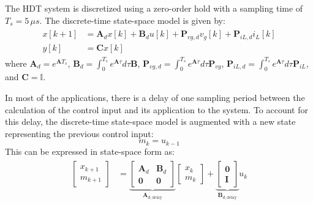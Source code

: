 The HDT system is discretized using a zero-order hold with a sampling time of $T_s = 5\,\mu s$. The discrete-time state-space model is given by:
\begin{align}
    \begin{aligned}
        x[k+1] &= \mathbf{A}_d x[k] + \mathbf{B}_d u[k] + \mathbf{P}_{vg,d} v_g[k] + \mathbf{P}_{iL,d} i_L[k]\\
        y[k] &= \mathbf{C} x[k]
    \end{aligned}
\end{align}
where $\mathbf{A}_d = e^{\mathbf{A}T_s}$, $\mathbf{B}_d = \int_0^{T_s} e^{\mathbf{A}\tau} d\tau \mathbf{B}$, $\mathbf{P}_{vg,d} = \int_0^{T_s} e^{\mathbf{A}\tau} d\tau \mathbf{P}_{vg}$, $\mathbf{P}_{iL,d} = \int_0^{T_s} e^{\mathbf{A}\tau} d\tau \mathbf{P}_{iL}$, and $\mathbf{C} = \mathbb{I}$.

In most of the applications, there is a delay of one sampling period between the calculation of the control input and its application to the system. To account for this delay, the discrete-time state-space model is augmented with a new state representing the previous control input:
\begin{equation}
    m_k = u_{k - 1}
\end{equation}
This can be expressed in state-space form as:
\begin{align}
    \begin{aligned}
        \begin{bmatrix}
            x_{k + 1}\\
            m_{k + 1}
        \end{bmatrix}
        &=
        \underbrace{
        \begin{bmatrix}
            \mathbf{A}_d & \mathbf{B}_d \\
            \mathbf{0} & \mathbf{0}
        \end{bmatrix}
        }_{\mathbf{A}_{d,\text{delay}}}
        \begin{bmatrix}
            x_k\\
            m_k
        \end{bmatrix}
        +
        \underbrace{
        \begin{bmatrix}
            \mathbf{0}\\
            \mathbf{I}
        \end{bmatrix}
        }_{\mathbf{B}_{d,\text{delay}}}
        u_k \label{eq:AugmentedModel}
    \end{aligned}
\end{align}